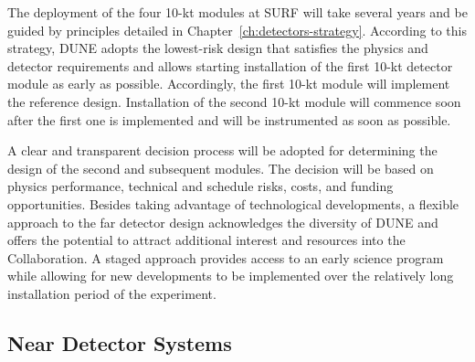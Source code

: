 The deployment of the four 10-kt modules at SURF will take several
years %
and be guided by principles detailed in
Chapter~\ref{ch:detectors-strategy}. According to this strategy, DUNE
 adopts the lowest-risk design that satisfies the
physics and detector requirements %
and allows starting installation of the first 10-kt detector module as early as possible.
Accordingly, the first 10-kt module will implement the reference design.   
Installation of the second 10-kt module will commence
soon after the first one is implemented   %
and will be instrumented as soon as possible. %


A clear and transparent decision process will be adopted for determining the design of the second
and subsequent modules. %
The decision will be based on physics performance,
technical and schedule risks, costs, and funding opportunities.  
Besides taking advantage of technological developments, a
flexible approach to the far detector design %
acknowledges the diversity of DUNE and offers the
potential to attract additional interest and resources into the
Collaboration. A staged approach provides access to an early science
program while allowing for %
new developments to be
implemented %
over the relatively long installation period of the experiment.

\subsection{Near Detector Systems}
\label{sec:intro-dune-near-det}

